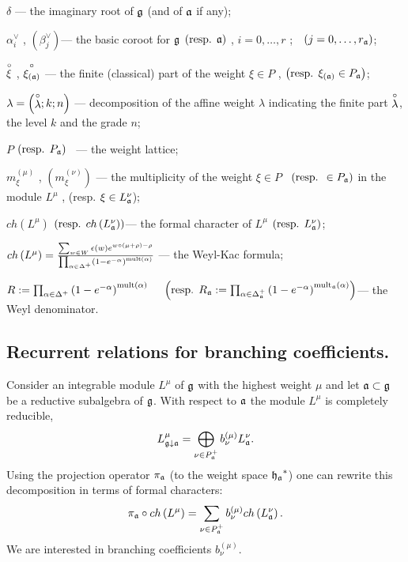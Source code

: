 $\delta $ --- the imaginary root of $\frak{g}$ (and of $\mathfrak{a}$ if any);

$\alpha _{i}^{\vee }$ , $\left( \beta _{j}^{\vee
}\right) $--- the basic coroot for $\frak{g}$ $\left( \mbox{resp. }\af%
\right) $ , $i=0,\ldots ,r$ ;\ \ $\left( j=0,\ldots ,r_{\mathfrak{a}}\right) $;

$\stackrel{\circ }{\xi }$ , $\stackrel{\circ }{\xi _{\left( \mathfrak{a}\right) }}$
--- the finite (classical) part of the weight $\xi \in P$ , $\left( \mbox{%
resp. }\xi _{\left( \af\right) }\in P_{\af}\right) $;

$\lambda =\left( \stackrel{\circ }{\lambda };k;n\right) $ ---
decomposition of the affine weight $\lambda$ indicating the finite
part $\stackrel{\circ }{\lambda }$, the level $k$ and the grade $n$;

$P$ $\left( \mbox{resp. } P_{\mathfrak{a}}\right) $ \ --- the weight lattice;

$m_{\xi }^{\left( \mu \right) }$ , $\left( m_{\xi }^{\left( \nu \right)
}\right) $ --- the multiplicity of the weight $\xi \in P$ \ $\left( \mbox{%
resp. }\in P_{\af}\right) $ in the module $L^{\mu }$ , (resp. $\xi \in
L_{\mathfrak{a}}^{\nu } $);

$ch\left( L^{\mu }\right) $ $\left( \mbox{resp. }ch\left( L_{\mathfrak{a}}^{\nu
}\right) \right) $--- the formal character of $L^{\mu }$ $\left( \mbox{resp. }%
L_{\af}^{\nu }\right) $;

$ch\left( L^{\mu }\right) =\frac{\sum_{w\in W}\epsilon (w)e^{w\circ (\mu
+\rho )-\rho }}{\prod_{\alpha \in \Delta ^{+}}\left( 1-e^{-\alpha }\right) ^{%
\mathrm{{mult}\left( \alpha \right) }}}$ --- the Weyl-Kac formula;

$R:=\prod_{\alpha \in \Delta ^{+}}\left( 1-e^{-\alpha }\right) ^{\mathrm{{%
mult}\left( \alpha \right) }}\quad $
$\left( \mbox{resp. }R_{\af}:=\prod_{\alpha \in \Delta _{%
\af}^{+}}\left( 1-e^{-\alpha }\right) ^{\mathrm{mult}_{\af}\mathrm{%
\left( \alpha \right) }}\right) $--- the Weyl denominator.



\subsection{Recurrent relations for branching coefficients.}
\label{sec:recurr-form-branch}

Consider an integrable module $L^{\mu }$
of $\frak{g}$ with the highest weight $\mu $ and
let $\mathfrak{a}\subset \frak{g}$ be a reductive subalgebra of $\frak{g}$.
With respect to $\mathfrak{a}$ the module $L^{\mu }$ is completely reducible,
\begin{equation*}
 L_{\frak{g}\downarrow \mathfrak{a}}^{\mu }=\bigoplus
\limits_{\nu \in P_{\mathfrak{a}}^{+}}b_{\nu }^{\left( \mu \right) }L_{\mathfrak{a}}^{\nu }.
\end{equation*}
Using the projection operator $\pi_{\mathfrak{a}}$ (to the weight space $\frak{h_a}^*$)
one can  rewrite this decomposition in terms of formal characters:
\begin{equation}
\label{branching1}
 \pi _{\mathfrak{a}}\circ ch\left( L^{\mu }\right)
 =\sum_{\nu \in P_{\mathfrak{a}}^{+}}b_{\nu }^{(\mu)}ch\left( L_{\mathfrak{a}}^{\nu }\right) .
\end{equation}
We are interested in branching coefficients $b^{(\mu)}_{\nu}$.

